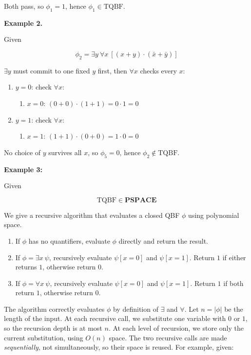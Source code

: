 \documentclass[12pt,a4paper,openany]{article}
\begin{document}
Both pass, so $\phi_1 = 1$, hence $\phi_1 \in \mathrm{TQBF}$.

\textbf{Example 2.}

Given

\[
\phi_2 = \exists y\ \forall x\ [(x + y) \cdot (\bar{x} + \bar{y})]
\]

$\exists y$ must commit to one fixed $y$ first, then $\forall x$ checks every $x$:

\begin{enumerate}
    \item $y = 0$: check $\forall x$:
    \begin{enumerate}
        \item $x = 0$: $(0 + 0) \cdot (1 + 1) = 0 \cdot 1 = 0$ 
    \end{enumerate}
    \item $y = 1$: check $\forall x$:
    \begin{enumerate}
        \item $x = 1$: $(1 + 1) \cdot (0 + 0) = 1 \cdot 0 = 0$ 
    \end{enumerate}
\end{enumerate}

No choice of $y$ survives all $x$, so $\phi_5 = 0$, hence $\phi_2 \notin \mathrm{TQBF}$.

\textbf{Example 3:}

Given 

\[\mathrm{TQBF} \in \mathbf{PSPACE}\]

We give a recursive algorithm that evaluates a closed QBF $\phi$ using polynomial space.


\begin{enumerate}
    \item If $\phi$ has no quantifiers, evaluate $\phi$ directly and return the result.
    \item If $\phi = \exists x\ \psi$, recursively evaluate $\psi[x = 0]$ and $\psi[x = 1]$.
    Return $1$ if either returns $1$, otherwise return $0$.
    \item If $\phi = \forall x\ \psi$, recursively evaluate $\psi[x = 0]$ and $\psi[x = 1]$.
    Return $1$ if both return $1$, otherwise return $0$.
\end{enumerate}

The algorithm correctly evaluates $\phi$ by definition of $\exists$ and $\forall$.
Let $n = |\phi|$ be the length of the input. At each recursive call, 
we substitute one variable with $0$ or $1$, so the recursion depth is at most $n$. 
At each level of recursion, we store only the current substitution, using $O(n)$ space. 
The two recursive calls are made \emph{sequentially}, not simultaneously, so their space 
is reused. For example, given:
\end{document}
